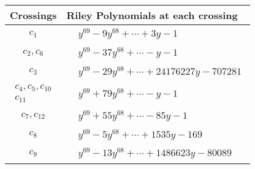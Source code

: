 \documentclass[1p]{elsarticle_modified}
\theoremstyle{definition}
\begin{document}
\begin{tabular}{m{50pt}|m{274pt}}
Crossings & \hspace{64pt}Riley Polynomials at each crossing \\
\hline $$\begin{aligned}c_{1}\end{aligned}$$&$\begin{aligned}
&y^{69}-9 y^{68}+\cdots+3 y-1
\end{aligned}$\\
\hline $$\begin{aligned}c_{2},c_{6}\end{aligned}$$&$\begin{aligned}
&y^{69}-37 y^{68}+\cdots- y-1
\end{aligned}$\\
\hline $$\begin{aligned}c_{3}\end{aligned}$$&$\begin{aligned}
&y^{69}-29 y^{68}+\cdots+24176227 y-707281
\end{aligned}$\\
\hline $$\begin{aligned}c_{4},c_{5},c_{10}\\c_{11}\end{aligned}$$&$\begin{aligned}
&y^{69}+79 y^{68}+\cdots- y-1
\end{aligned}$\\
\hline $$\begin{aligned}c_{7},c_{12}\end{aligned}$$&$\begin{aligned}
&y^{69}+55 y^{68}+\cdots-85 y-1
\end{aligned}$\\
\hline $$\begin{aligned}c_{8}\end{aligned}$$&$\begin{aligned}
&y^{69}-5 y^{68}+\cdots+1535 y-169
\end{aligned}$\\
\hline $$\begin{aligned}c_{9}\end{aligned}$$&$\begin{aligned}
&y^{69}-13 y^{68}+\cdots+1486623 y-80089
\end{aligned}$\\
\hline
\end{tabular}
\vskip 2pc
\end{document}
